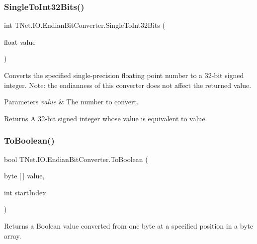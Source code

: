 \subsubsection{\texorpdfstring{Single\+To\+Int32\+Bits()}{SingleToInt32Bits()}}
{\footnotesize\ttfamily int T\+Net.\+I\+O.\+Endian\+Bit\+Converter.\+Single\+To\+Int32\+Bits (\begin{DoxyParamCaption}\item[{float}]{value }\end{DoxyParamCaption})}



Converts the specified single-\/precision floating point number to a 32-\/bit signed integer. Note\+: the endianness of this converter does not affect the returned value. 


\begin{DoxyParams}{Parameters}
{\em value} & The number to convert. \\
\hline
\end{DoxyParams}
\begin{DoxyReturn}{Returns}
A 32-\/bit signed integer whose value is equivalent to value.
\end{DoxyReturn}
\mbox{\label{class_t_net_1_1_i_o_1_1_endian_bit_converter_ac08a3108ce00f7bbc088c361777bce52}} 
\subsubsection{\texorpdfstring{To\+Boolean()}{ToBoolean()}}
{\footnotesize\ttfamily bool T\+Net.\+I\+O.\+Endian\+Bit\+Converter.\+To\+Boolean (\begin{DoxyParamCaption}\item[{byte \mbox{[}$\,$\mbox{]}}]{value,  }\item[{int}]{start\+Index }\end{DoxyParamCaption})}



Returns a Boolean value converted from one byte at a specified position in a byte array. 


